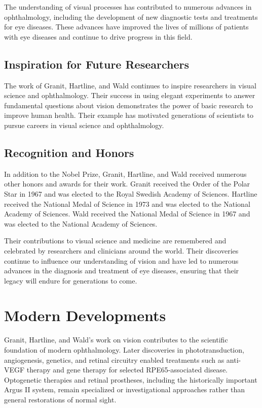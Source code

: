The understanding of visual processes has contributed to numerous advances in ophthalmology, including the development of new diagnostic tests and treatments for eye diseases. These advances have improved the lives of millions of patients with eye diseases and continue to drive progress in this field.

\subsection{Inspiration for Future Researchers}

The work of Granit, Hartline, and Wald continues to inspire researchers in visual science and ophthalmology. Their success in using elegant experiments to answer fundamental questions about vision demonstrates the power of basic research to improve human health. Their example has motivated generations of scientists to pursue careers in visual science and ophthalmology.

\subsection{Recognition and Honors}

In addition to the Nobel Prize, Granit, Hartline, and Wald received numerous other honors and awards for their work. Granit received the Order of the Polar Star in 1967 and was elected to the Royal Swedish Academy of Sciences. Hartline received the National Medal of Science in 1973 and was elected to the National Academy of Sciences. Wald received the National Medal of Science in 1967 and was elected to the National Academy of Sciences.

Their contributions to visual science and medicine are remembered and celebrated by researchers and clinicians around the world. Their discoveries continue to influence our understanding of vision and have led to numerous advances in the diagnosis and treatment of eye diseases, ensuring that their legacy will endure for generations to come.


\section{Modern Developments}

Granit, Hartline, and Wald's work on vision contributes to the scientific foundation of modern ophthalmology. Later discoveries in phototransduction, angiogenesis, genetics, and retinal circuitry enabled treatments such as anti-VEGF therapy and gene therapy for selected RPE65-associated disease. Optogenetic therapies and retinal prostheses, including the historically important Argus II system, remain specialized or investigational approaches rather than general restorations of normal sight.


